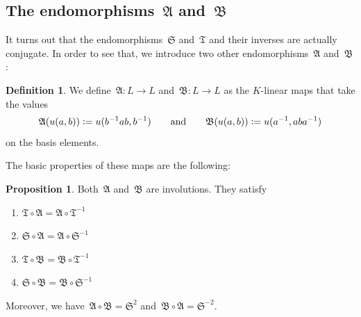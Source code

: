 \documentclass[12pt]{article}
\newcounter{num}
\theoremstyle{definition}
\newtheorem{Proposition}[Satz]{Proposition}
\newtheorem{Definition}[Satz]{Definition}
\theoremstyle{break}
\newcommand{\fA}{\mathfrak{A}}
\newcommand{\fB}{\mathfrak{B}}
\newcommand{\fS}{\mathfrak{S}}
\newcommand{\fT}{\mathfrak{T}}
\renewcommand{\1}{\mathbbm{1}}
\newcommand{\uu}{u}
\newcommand{\deq}{\vcentcolon =}
\begin{document}
\subsection{The endomorphisms~$\fA$ and~$\fB$} \label{EndomAB}
It turns out that the endomorphisms~$\fS$ and~$\fT$ and their inverses are actually conjugate. In order to see that, we introduce two other endomorphisms~$\fA$ and~$\fB$:
\begin{Definition} \label{DefAB}
We define~$\fA \colon L \to L$ and~$\fB \colon L \to L$ as the $K$-linear maps that take the values
\[\fA(\uu(a,b)) \deq \uu(b^{-1} a b, b^{-1}) \qquad \text{and} \qquad
\fB(\uu(a,b)) \deq \uu(a^{-1}, a b a^{-1})\]
on the basis elements.
\end{Definition}

The basic properties of these maps are the following:
\begin{Proposition} \label{Conjug}
Both~$\fA$ and~$\fB$ are involutions. They satisfy
\begin{enumerate}
\item
$\fT \circ \fA = \fA \circ \fT^{-1}$

\item
$\fS \circ \fA = \fA \circ \fS^{-1}$

\item
$\fT \circ \fB = \fB \circ \fT^{-1}$

\item
$\fS \circ \fB = \fB \circ \fS^{-1}$
\end{enumerate}
Moreover, we have~$\fA \circ \fB = \fS^2$ and~$\fB \circ \fA = \fS^{-2}$.
\end{Proposition}
\end{document}
